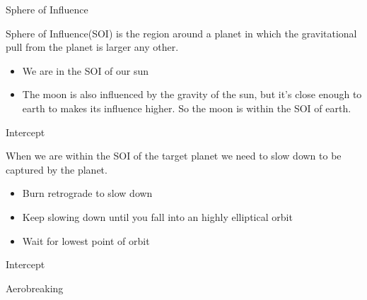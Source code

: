 {
%
\begin{frame}
\end{frame}
\begin{frame}[t]{Sphere of Influence}
    \begin{block}{}
    Sphere of Influence(SOI) is the region around a planet in which the gravitational pull from the planet is larger
    any other.
    \begin{itemize}
        \item We are in the SOI of our sun
        \item The moon is also influenced by the gravity of the sun, but it's close enough to earth to makes its
            influence higher. So the moon is within the SOI of earth.
    \end{itemize}
    \end{block}
\end{frame}
\begin{frame}[t]{Intercept}
    \begin{block}{}
        When we are within the SOI of the target planet we need to slow down to be captured by the planet.
        \begin{itemize}
            \item Burn retrograde to slow down
            \item Keep slowing down until you fall into an highly elliptical orbit
            \item Wait for lowest point of orbit
        \end{itemize}
    \end{block}
\end{frame}
\begin{frame}[t]{Intercept}
    \begin{block}{Aerobreaking}

\end{block}
\end{frame}}
